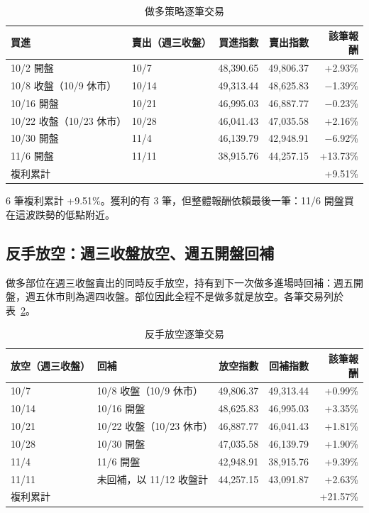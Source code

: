 \documentclass[11pt,a4paper]{article}
\newcommand{\m}{\ensuremath{-}}
\begin{document}
\begin{table}[htbp]
\centering
\caption{做多策略逐筆交易}
\label{tab:long}
\begin{tabular}{llrrr}
\toprule
買進 & 賣出（週三收盤） & 買進指數 & 賣出指數 & 該筆報酬\\
\midrule
10/2 開盤 & 10/7 & 48,390.65 & 49,806.37 & +2.93\%\\
10/8 收盤（10/9 休市） & 10/14 & 49,313.44 & 48,625.83 & \m 1.39\%\\
10/16 開盤 & 10/21 & 46,995.03 & 46,887.77 & \m 0.23\%\\
10/22 收盤（10/23 休市） & 10/28 & 46,041.43 & 47,035.58 & +2.16\%\\
10/30 開盤 & 11/4 & 46,139.79 & 42,948.91 & \m 6.92\%\\
11/6 開盤 & 11/11 & 38,915.76 & 44,257.15 & +13.73\%\\
\midrule
\multicolumn{4}{l}{複利累計} & +9.51\%\\
\bottomrule
\end{tabular}
\end{table}

6 筆複利累計 +9.51\%。獲利的有 3 筆，但整體報酬依賴最後一筆：11/6 開盤買在這波跌勢的低點附近。

\subsection{反手放空：週三收盤放空、週五開盤回補}

做多部位在週三收盤賣出的同時反手放空，持有到下一次做多進場時回補：週五開盤，週五休市則為週四收盤。部位因此全程不是做多就是放空。各筆交易列於表~\ref{tab:short}。

\begin{table}[htbp]
\centering
\caption{反手放空逐筆交易}
\label{tab:short}
\begin{tabular}{llrrr}
\toprule
放空（週三收盤） & 回補 & 放空指數 & 回補指數 & 該筆報酬\\
\midrule
10/7 & 10/8 收盤（10/9 休市） & 49,806.37 & 49,313.44 & +0.99\%\\
10/14 & 10/16 開盤 & 48,625.83 & 46,995.03 & +3.35\%\\
10/21 & 10/22 收盤（10/23 休市） & 46,887.77 & 46,041.43 & +1.81\%\\
10/28 & 10/30 開盤 & 47,035.58 & 46,139.79 & +1.90\%\\
11/4 & 11/6 開盤 & 42,948.91 & 38,915.76 & +9.39\%\\
11/11 & 未回補，以 11/12 收盤計 & 44,257.15 & 43,091.87 & +2.63\%\\
\midrule
\multicolumn{4}{l}{複利累計} & +21.57\%\\
\bottomrule
\end{tabular}
\end{table}
\end{document}
